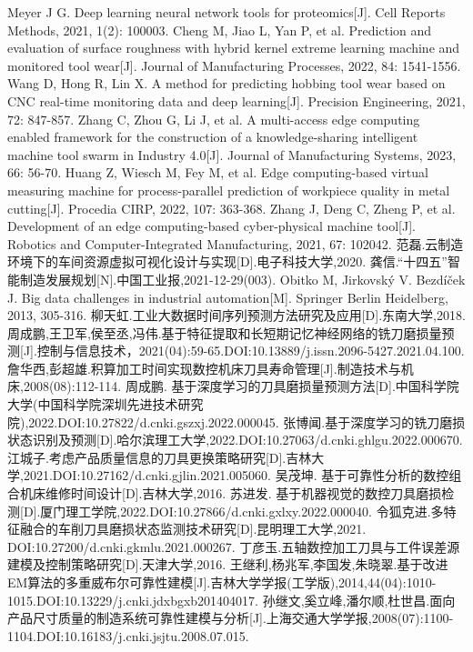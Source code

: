 \begin{thebibliography}{99}
% 
 Meyer J G. Deep learning neural network tools for proteomics[J]. Cell Reports Methods, 2021, 1(2): 100003.
% 
 Cheng M, Jiao L, Yan P, et al. Prediction and evaluation of surface roughness with hybrid kernel extreme learning machine and monitored tool wear[J]. Journal of Manufacturing Processes, 2022, 84: 1541-1556.
% 
 Wang D, Hong R, Lin X. A method for predicting hobbing tool wear based on CNC real-time monitoring data and deep learning[J]. Precision Engineering, 2021, 72: 847-857.
% 
% 
 Zhang C, Zhou G, Li J, et al. A multi-access edge computing enabled framework for the construction of a knowledge-sharing intelligent machine tool swarm in Industry 4.0[J]. Journal of Manufacturing Systems, 2023, 66: 56-70.
% 
 Huang Z, Wiesch M, Fey M, et al. Edge computing-based virtual measuring machine for process-parallel prediction of workpiece quality in metal cutting[J]. Procedia CIRP, 2022, 107: 363-368.
% 
 Zhang J, Deng C, Zheng P, et al. Development of an edge computing-based cyber-physical machine tool[J]. Robotics and Computer-Integrated Manufacturing, 2021, 67: 102042.
% 
% 
% 
范磊.云制造环境下的车间资源虚拟可视化设计与实现[D].电子科技大学,2020. 
 龚信.“十四五”智能制造发展规划[N].中国工业报,2021-12-29(003). 
 Obitko M, Jirkovský V. Bezdíček J. Big data challenges in industrial automation[M]. Springer Berlin Heidelberg, 2013, 305-316. 
 柳天虹.工业大数据时间序列预测方法研究及应用[D].东南大学,2018. 
 周成鹏,王卫军,侯至丞,冯伟.基于特征提取和长短期记忆神经网络的铣刀磨损量预测[J].控制与信息技术，2021(04):59-65.DOI:10.13889/j.issn.2096-5427.2021.04.100.
 詹华西,彭超雄.积算加工时间实现数控机床刀具寿命管理[J].制造技术与机床,2008(08):112-114. 
 周成鹏. 基于深度学习的刀具磨损量预测方法[D].中国科学院大学(中国科学院深圳先进技术研究院),2022.DOI:10.27822/d.cnki.gszxj.2022.000045.
 张博闻.基于深度学习的铣刀磨损状态识别及预测[D].哈尔滨理工大学,2022.DOI:10.27063/d.cnki.ghlgu.2022.000670.
% 
 江城子.考虑产品质量信息的刀具更换策略研究[D].吉林大学,2021.DOI:10.27162/d.cnki.gjlin.2021.005060.
 吴茂坤. 基于可靠性分析的数控组合机床维修时间设计[D].吉林大学,2016.
 苏进发. 基于机器视觉的数控刀具磨损检测[D].厦门理工学院,2022.DOI:10.27866/d.cnki.gxlxy.2022.000040.
 令狐克进.多特征融合的车削刀具磨损状态监测技术研究[D].昆明理工大学,2021. DOI:10.27200/d.cnki.gkmlu.2021.000267.
 丁彦玉.五轴数控加工刀具与工件误差源建模及控制策略研究[D].天津大学,2016.
 王继利,杨兆军,李国发,朱晓翠.基于改进EM算法的多重威布尔可靠性建模[J].吉林大学学报(工学版),2014,44(04):1010-1015.DOI:10.13229/j.cnki.jdxbgxb201404017.
 孙继文,奚立峰,潘尔顺,杜世昌.面向产品尺寸质量的制造系统可靠性建模与分析[J].上海交通大学学报,2008(07):1100-1104.DOI:10.16183/j.cnki.jsjtu.2008.07.015.
\end{thebibliography}
% 